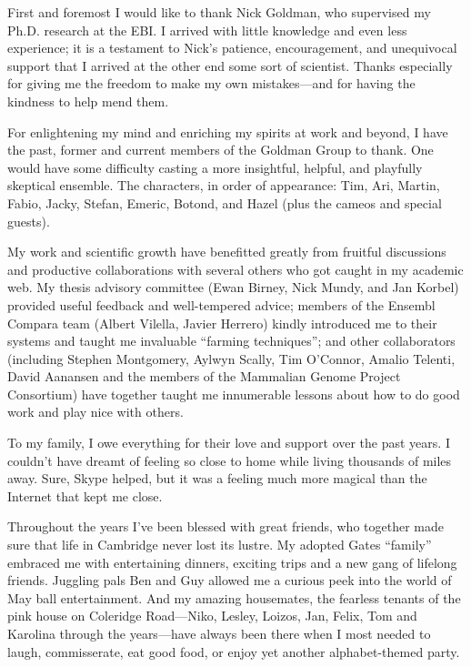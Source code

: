 \begin{acknowledgements}      %

First and foremost I would like to thank Nick Goldman, who supervised
my Ph.D. research at the EBI. I arrived with little knowledge and even
less experience; it is a testament to Nick's patience, encouragement,
and unequivocal support that I arrived at the other end some sort of
scientist. Thanks especially for giving me the freedom to make my own
mistakes---and for having the kindness to help mend them.

For enlightening my mind and enriching my spirits at work and beyond,
I have the past, former and current members of the Goldman Group to
thank. One would have some difficulty casting a more insightful,
helpful, and playfully skeptical ensemble. The characters, in order of
appearance: Tim, Ari, Martin, Fabio, Jacky, Stefan, Emeric, Botond,
and Hazel (plus the cameos and special guests).

My work and scientific growth have benefitted greatly from fruitful
discussions and productive collaborations with several others who got
caught in my academic web. My thesis advisory committee (Ewan Birney,
Nick Mundy, and Jan Korbel) provided useful feedback and well-tempered
advice; members of the Ensembl Compara team (Albert Vilella, Javier
Herrero) kindly introduced me to their systems and taught me
invaluable ``farming techniques''; and other collaborators (including
Stephen Montgomery, Aylwyn Scally, Tim O'Connor, Amalio Telenti, David
Aanansen and the members of the Mammalian Genome Project Consortium)
have together taught me innumerable lessons about how to do good work
and play nice with others.

To my family, I owe everything for their love and support over the
past years. I couldn't have dreamt of feeling so close to home while
living thousands of miles away. Sure, Skype helped, but it was a
feeling much more magical than the Internet that kept me close.

Throughout the years I've been blessed with great friends, who
together made sure that life in Cambridge never lost its lustre. My adopted
Gates ``family'' embraced me with entertaining dinners, exciting trips
and a new gang of lifelong friends. Juggling pals Ben and Guy allowed
me a curious peek into the world of May ball entertainment. And my
amazing housemates, the fearless tenants of the pink house on
Coleridge Road---Niko, Lesley, Loizos, Jan, Felix, Tom and Karolina
through the years---have always been there when I most needed to
laugh, commisserate, eat good food, or enjoy yet another alphabet-themed
party.


\end{acknowledgements}
